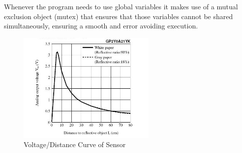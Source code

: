 Whenever the program needs to use global variables it makes use of a mutual exclusion object (mutex) that ensures that those variables cannot be shared simultaneously, ensuring a smooth and error avoiding execution.
\begin{figure}[!htbp]
\centering
       \includegraphics[page=1,width=0.6\textwidth]{img/sensorCurve.jpg} 
\caption{Voltage/Distance Curve of Sensor}%
\label{fig:sensorCurvel}
\end{figure}